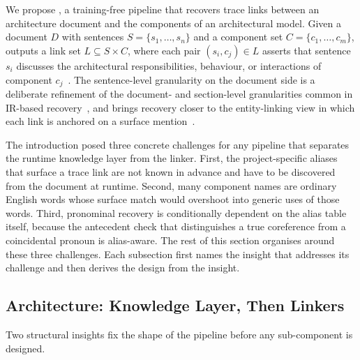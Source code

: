 \section{\approach}\label{sec:approach}

We propose \approach, a training-free pipeline that recovers trace links between an architecture document and the components of an architectural model.
Given a document $D$ with sentences $S = \{s_1, \ldots, s_n\}$ and a component set $C = \{c_1, \ldots, c_m\}$, \approach outputs a link set $L \subseteq S \times C$, where each pair $(s_i, c_j) \in L$ asserts that sentence $s_i$ discusses the architectural responsibilities, behaviour, or interactions of component $c_j$~\cite{gotel1994analysis,ramesh2001toward,clelandhuang2012handbook,spanoudakis2005software}.
The sentence-level granularity on the document side is a deliberate refinement of the document- and section-level granularities common in IR-based recovery~\cite{antoniol2002recovering,marcus2003recovering,borg2014recovering}, and brings recovery closer to the entity-linking view in which each link is anchored on a surface mention~\cite{mihalcea2007wikify,hachey2013evaluating}.

The introduction posed three concrete challenges for any pipeline that separates the runtime knowledge layer from the linker.
First, the project-specific aliases that surface a trace link are not known in advance and have to be discovered from the document at runtime.
Second, many component names are ordinary English words whose surface match would overshoot into generic uses of those words.
Third, pronominal recovery is conditionally dependent on the alias table itself, because the antecedent check that distinguishes a true coreference from a coincidental pronoun is alias-aware.
The rest of this section organises \approach around these three challenges.
Each subsection first names the insight that addresses its challenge and then derives the design from the insight.

\subsection{Architecture: Knowledge Layer, Then Linkers}\label{sec:arch}

Two structural insights fix the shape of the pipeline before any sub-component is designed.

